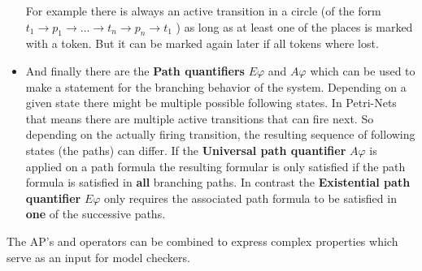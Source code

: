 \begin{itemize}
  For example there is always an active transition in a circle (of the form $t_1\rightarrow p_1 \rightarrow ... \rightarrow t_n \rightarrow p_n \rightarrow t_1$ ) as long as at least one of the places is marked with a token.
  But it can be marked again later if all tokens where lost.
  \item And finally there are the \textbf{Path quantifiers} $E\varphi$ and $A\varphi$ which can be used to make a statement for the branching behavior of the system.
  Depending on a given state there might be multiple possible following states.
  In Petri-Nets that means there are multiple active transitions that can fire next.
  So depending on the actually firing transition, the resulting sequence of following states (the paths) can differ.
  If the \textbf{Universal path quantifier} $A\varphi$ is applied on a path formula the resulting formular is only satisfied if the path formula is satisfied in \textbf{all} branching paths.
  In contrast the \textbf{Existential path quantifier} $E\varphi$ only requires the associated path formula to be satisfied in \textbf{one} of the successive paths.
\end{itemize}
The AP's and operators can be combined to express complex properties which serve as an input for model checkers.
